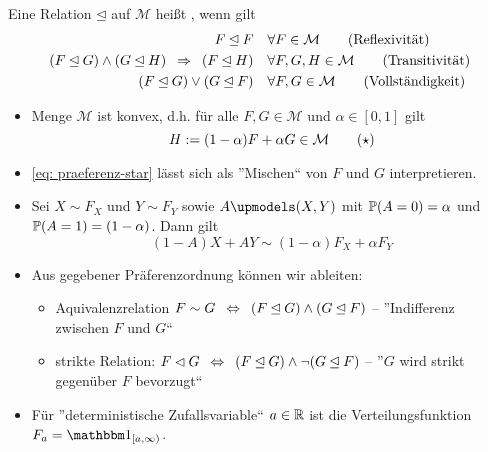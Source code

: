 \begin{*definition}
	Eine Relation $\unlhd$ auf $\mathcal{M}$ heißt , wenn gilt
	\begin{align*}
		F \unlhd F \quad &\forall F \in \mathcal{M} \tag{Reflexivität} \\
		(F \unlhd G) \land (G \unlhd H) \follows (F \unlhd H) \quad &\forall F, G, H \in \mathcal{M} \tag{Transitivität} \\
		(F \unlhd G) \lor (G \unlhd F) \quad &\forall F,G \in \mathcal{M} \tag{Vollständigkeit}
	\end{align*}
\end{*definition}
\begin{*bemerkung}
	\begin{itemize}[nolistsep]
		\item Menge $\mathcal{M}$ ist konvex, d.h. für alle $F,G \in \mathcal{M}$ und $\alpha \in [0,1]$ gilt
		\begin{equation*}
			H \defeq (1-\alpha) F + \alpha G \in \mathcal{M}
			\tag{$\star$} \label{eq: praeferenz-star}
		\end{equation*}
		\item \eqref{eq: praeferenz-star} lässt sich als ''Mischen`` von $F$ und $G$ interpretieren.
		\item Sei $X \sim F_X$ und $Y \sim F_Y$ sowie $A \upmodels (X,Y)$ mit $\P(A = 0) = \alpha$ und $\P(A = 1) = (1-\alpha)$. Dann gilt
		\begin{equation*}
			(1-A) X + A Y \sim (1-\alpha) F_X + \alpha F_Y
		\end{equation*}
		\item Aus gegebener Präferenzordnung können wir ableiten:
		\begin{itemize}
			\item Aquivalenzrelation $F \sim G \equivalent (F \unlhd G) \land (G \unlhd F)$ -- ''Indifferenz zwischen $F$ und $G$``
			\item strikte Relation: $F \lhd G \equivalent (F \unlhd G) \land \lnot (G \unlhd F)$ -- ''$G$ wird strikt gegenüber $F$ bevorzugt``
		\end{itemize}
		\item Für ''deterministische Zufallsvariable`` $a \in \R$ ist die Verteilungsfunktion $F_a = \one_{[a,\infty)}$.
	\end{itemize}
\end{*bemerkung}

